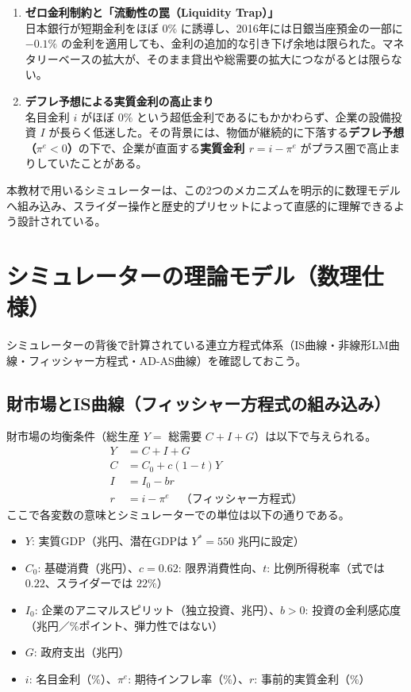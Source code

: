 \documentclass[lualatex,a4paper,11pt,ja=standard]{bxjsarticle}
\begin{document}
\begin{enumerate}[label=\textbf{パズル\arabic*:},leftmargin=22mm]
  \item \textbf{ゼロ金利制約と「流動性の罠（Liquidity Trap）」}\\
  日本銀行が短期金利をほぼ $0\%$ に誘導し、2016年には日銀当座預金の一部に $-0.1\%$ の金利を適用しても、金利の追加的な引き下げ余地は限られた。マネタリーベースの拡大が、そのまま貸出や総需要の拡大につながるとは限らない。
  \item \textbf{デフレ予想による実質金利の高止まり}\\
  名目金利 $i$ がほぼ $0\%$ という超低金利であるにもかかわらず、企業の設備投資 $I$ が長らく低迷した。その背景には、物価が継続的に下落する\textbf{デフレ予想（$\pi^e < 0$）}の下で、企業が直面する\textbf{実質金利 $r = i - \pi^e$} がプラス圏で高止まりしていたことがある。
\end{enumerate}

本教材で用いるシミュレーターは、この2つのメカニズムを明示的に数理モデルへ組み込み、スライダー操作と歴史的プリセットによって直感的に理解できるよう設計されている。

\section{シミュレーターの理論モデル（数理仕様）}

シミュレーターの背後で計算されている連立方程式体系（IS曲線・非線形LM曲線・フィッシャー方程式・AD-AS曲線）を確認しておこう。

\subsection{財市場とIS曲線（フィッシャー方程式の組み込み）}

財市場の均衡条件（総生産 $Y =$ 総需要 $C + I + G$）は以下で与えられる。
\begin{align}
  Y &= C + I + G \label{eq:goods_eq} \\
  C &= C_0 + c(1 - t)Y \label{eq:consumption} \\
  I &= I_0 - b r \label{eq:investment} \\
  r &= i - \pi^e \quad \text{（フィッシャー方程式）} \label{eq:fisher}
\end{align}
ここで各変数の意味とシミュレーターでの単位は以下の通りである。
\begin{itemize}[noitemsep]
  \item $Y$: 実質GDP（兆円、潜在GDPは $Y^* = 550$ 兆円に設定）
  \item $C_0$: 基礎消費（兆円）、$c = 0.62$: 限界消費性向、$t$: 比例所得税率（式では $0.22$、スライダーでは $22\%$）
  \item $I_0$: 企業のアニマルスピリット（独立投資、兆円）、$b > 0$: 投資の金利感応度（兆円／\%ポイント、弾力性ではない）
  \item $G$: 政府支出（兆円）
  \item $i$: 名目金利（$\%$）、$\pi^e$: 期待インフレ率（$\%$）、$r$: 事前的実質金利（$\%$）
\end{itemize}
\end{document}
